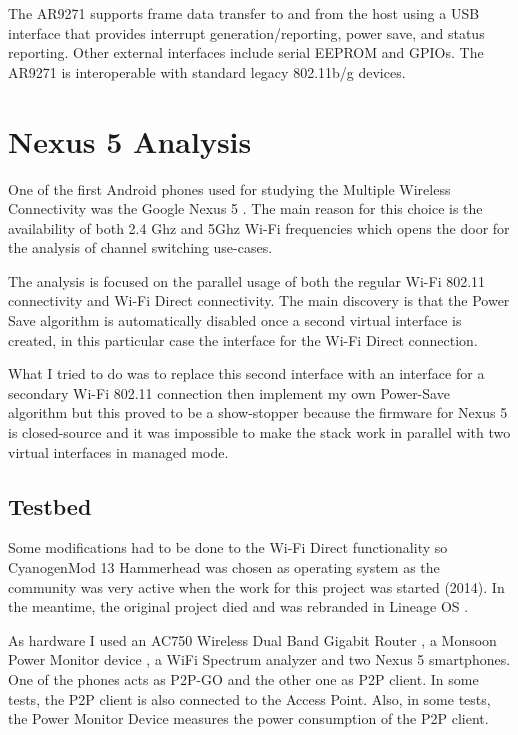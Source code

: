 The AR9271 supports frame data transfer to and from the host using a USB interface that provides interrupt generation/reporting, power save, and status reporting. Other external interfaces include serial EEPROM and GPIOs. The AR9271 is interoperable with standard legacy 802.11b/g devices.


\chapter{Nexus 5 Analysis}

One of the first Android phones used for studying the Multiple Wireless Connectivity was the Google Nexus 5 \cite{cite-nexus5}. The main reason for this choice is the availability of both 2.4 Ghz and 5Ghz Wi-Fi frequencies which opens the door for the analysis of channel switching use-cases. 

The analysis is focused on the parallel usage of both the regular Wi-Fi 802.11 connectivity and Wi-Fi Direct connectivity. The main discovery is that the Power Save algorithm is automatically disabled once a second virtual interface is created, in this particular case the interface for the Wi-Fi Direct connection. 

What I tried to do was to replace this second interface with an interface for a secondary Wi-Fi 802.11 connection then implement my own Power-Save algorithm but this proved to be a show-stopper because the firmware for Nexus 5 is closed-source and it was impossible to make the stack work in parallel with two virtual interfaces in managed mode.


\section{Testbed}
\label{sec:testbed}

Some modifications had to be done to the Wi-Fi Direct functionality so CyanogenMod 13 Hammerhead was chosen as operating system as the community was very active when the work for this project was started (2014). In the meantime, the original project died and was rebranded in Lineage OS \cite{cite-lineage}.

As hardware I used an AC750 Wireless Dual Band Gigabit Router \cite{cite-router}, a Monsoon Power Monitor device \cite{cite-monsoon}, a WiFi Spectrum analyzer and two Nexus 5 smartphones. One of the phones acts as P2P-GO and the other one as P2P client. In some tests, the P2P client is also connected to the Access Point. Also, in some tests, the Power Monitor Device measures the power consumption of the P2P client.

